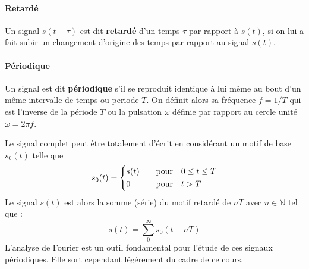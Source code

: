 \paragraph{Retardé}
Un signal $s(t-\tau)$ est dit \textbf{retardé} d'un temps $\tau$ 
par rapport à $s(t)$, si on lui a fait subir un changement
d'origine des temps par rapport au signal $s(t)$.
\begin{center}
    
\end{center}
\paragraph{Périodique}
Un signal est dit \textbf{périodique} s'il se reproduit identique à lui
même au bout d'un même intervalle de temps ou periode $T$. On définit alors 
sa fréquence $f=1/T$ qui est l'inverse de la période $T$ ou la pulsation 
$\omega$ définie par rapport au cercle unité $\omega=2\pi f$.
\begin{figure}[!htb]
    \centering
    
\end{figure}
Le signal complet peut être totalement d'écrit en considérant un motif de base 
$s_0(t)$ telle que
\begin{align*}
    s_0(t) =
    \begin{dcases}
        s(t)&\quad\text{pour}\quad 0\le t\le T   \\
        0&\quad\text{pour}\quad t>T
    \end{dcases}
\end{align*}
Le signal $s(t)$ est alors la somme (série) du motif retardé de $nT$ 
avec $n\in\mathbb{N}$ tel que :
\[
s(t)=\sum_0^\infty s_0(t-nT)
\]
L'analyse de Fourier est un outil fondamental pour l'étude 
de ces signaux périodiques. Elle sort cependant légérement du cadre de 
ce cours.
\newpage
